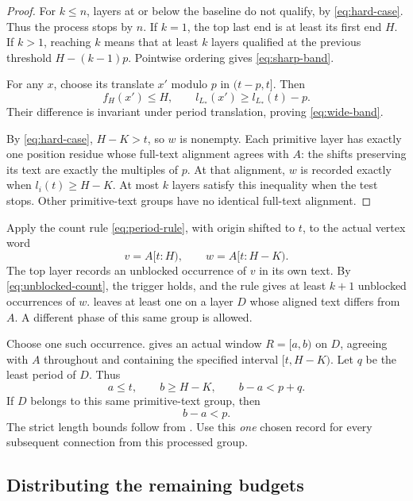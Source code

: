 \begin{proof}
For $k\le n$, layers at or below the baseline do not qualify, by \eqref{eq:hard-case}. Thus the process stops by $n$. If $k=1$, the top last end is at least its first end $H$. If $k>1$, reaching $k$ means that at least $k$ layers qualified at the previous threshold $H-(k-1)p$. Pointwise ordering gives \eqref{eq:sharp-band}.

For any $x$, choose its translate $x'$ modulo $p$ in $(t-p,t]$. Then
\[
f_H(x')\le H,
\qquad l_{L_*}(x')\ge l_{L_*}(t)-p.
\]
Their difference is invariant under period translation, proving \eqref{eq:wide-band}.

By \eqref{eq:hard-case}, $H-K>t$, so $w$ is nonempty. Each primitive layer has exactly one position residue whose full-text alignment agrees with $A$: the shifts preserving its text are exactly the multiples of $p$. At that alignment, $w$ is recorded exactly when $l_i(t)\ge H-K$. At most $k$ layers satisfy this inequality when the test stops. Other primitive-text groups have no identical full-text alignment.
\end{proof}

Apply the count rule \eqref{eq:period-rule}, with origin shifted to $t$, to the actual vertex word
\[
v=A[t:H),\qquad w=A[t:H-K).
\]
The top layer records an unblocked occurrence of $v$ in its own text. By \eqref{eq:unblocked-count}, the trigger holds, and the rule gives at least $k+1$ unblocked occurrences of $w$.  leaves at least one on a layer $D$ whose aligned text differs from $A$. A different phase of this same group is allowed.

Choose one such occurrence.  gives an actual window $R=[a,b)$ on $D$, agreeing with $A$ throughout and containing the specified interval $[t,H-K)$. Let $q$ be the least period of $D$. Thus
\begin{equation}\label{eq:chosen-record}
a\le t,
\qquad b\ge H-K,
\qquad b-a<p+q.
\end{equation}
If $D$ belongs to this same primitive-text group, then
\begin{equation}\label{eq:same-group-record}
b-a<p.
\end{equation}
The strict length bounds follow from . Use this \emph{one} chosen record for every subsequent connection from this processed group.

\subsection{Distributing the remaining budgets}

